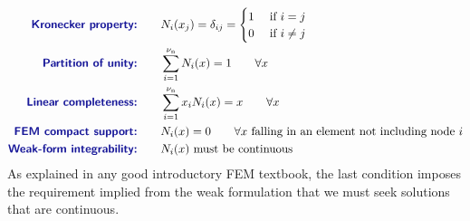 \begin{subequations}
\begin{align}
\text{\Defn{Kronecker property:}}\qquad&
\NBF_i(x_j)=\delta_{ij}=\begin{cases}
                                1 &\text{ if }i=j
                                \\
                                0 & \text{ if }i\ne j
                         \end{cases}
\label{eq:oneDRequirementsOnShapeFnsKronecker}
\\
\text{\Defn{Partition of unity:}}\qquad&
\sum\limits_{i=1}^\numnodes \NBF_i(x)=1     \qquad\forall x
\\
\text{\Defn{Linear completeness:}}\qquad&
\sum\limits_{i=1}^\numnodes x_i\NBF_i(x)=x     \qquad\forall x
\\
\text{\Defn{FEM compact support:}}\qquad&
\NBF_i(x)=0 \qquad\forall x 
\text{ falling in an element not including node $i$}
\label{eq:oneDRequirementsOnShapeFnsFEMsupport}
\\
\text{\Defn{Weak-form integrability:}}\qquad&
\NBF_i(x)\text{ must be continuous}
\label{eq:oneDRequirementsOnShapeFnsFEMcontinuity}
\end{align}
\label{eq:oneDRequirementsOnShapeFns}
\end{subequations}
As explained in any good introductory FEM textbook, the last condition imposes the requirement implied from the weak formulation that we must seek solutions that are continuous.

